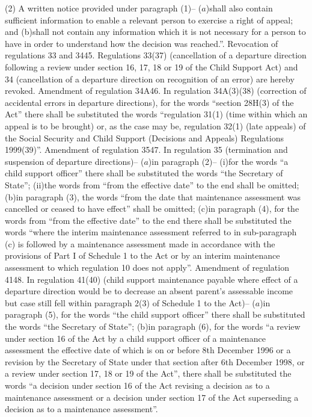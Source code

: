 \documentclass[12pt,a4paper]{article}
\begin{document}
(2) A written notice provided under paragraph (1)–
($a$)shall also contain sufficient information to enable a relevant person to exercise a right of appeal; and
(b)shall not contain any information which it is not necessary for a person to have in order to understand how the decision was reached.”.
Revocation of regulations 33 and 3445.  Regulations 33(37) (cancellation of a departure direction following a review under section 16, 17, 18 or 19 of the Child Support Act) and 34 (cancellation of a departure direction on recognition of an error) are hereby revoked.
Amendment of regulation 34A46.  In regulation 34A(3)(38) (correction of accidental errors in departure directions), for the words “section 28H(3) of the Act” there shall be substituted the words “regulation 31(1) (time within which an appeal is to be brought) or, as the case may be, regulation 32(1) (late appeals) of the Social Security and Child Support (Decisions and Appeals) Regulations 1999(39)”.
Amendment of regulation 3547.  In regulation 35 (termination and suspension of departure directions)–
($a$)in paragraph (2)–
(i)for the words “a child support officer” there shall be substituted the words “the Secretary of State”;
(ii)the words from “from the effective date” to the end shall be omitted;
(b)in paragraph (3), the words “from the date that maintenance assessment was cancelled or ceased to have effect” shall be omitted;
(c)in paragraph (4), for the words from “from the effective date” to the end there shall be substituted the words “where the interim maintenance assessment referred to in sub-paragraph (c) is followed by a maintenance assessment made in accordance with the provisions of Part I of Schedule 1 to the Act or by an interim maintenance assessment to which regulation 10 does not apply”.
Amendment of regulation 4148.  In regulation 41(40) (child support maintenance payable where effect of a departure direction would be to decrease an absent parent’s assessable income but case still fell within paragraph 2(3) of Schedule 1 to the Act)–
($a$)in paragraph (5), for the words “the child support officer” there shall be substituted the words “the Secretary of State”;
(b)in paragraph (6), for the words “a review under section 16 of the Act by a child support officer of a maintenance assessment the effective date of which is on or before 8th December 1996 or a revision by the Secretary of State under that section after 6th December 1998, or a review under section 17, 18 or 19 of the Act”, there shall be substituted the words “a decision under section 16 of the Act revising a decision as to a maintenance assessment or a decision under section 17 of the Act superseding a decision as to a maintenance assessment”.
\end{document}
